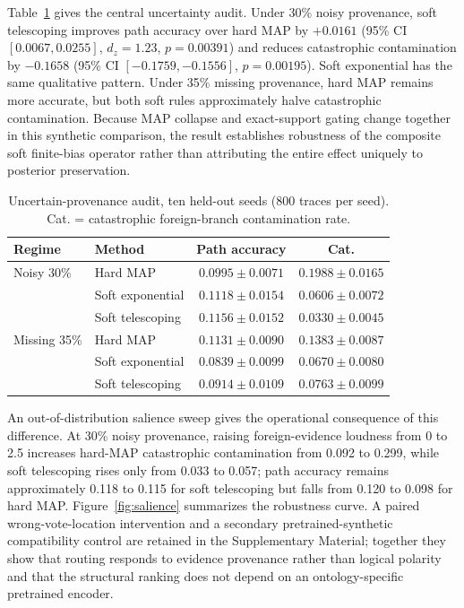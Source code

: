 \documentclass[preprint,11pt]{elsarticle}
\begin{document}
Table~\ref{tab:uncertain} gives the central uncertainty audit. Under 30\% noisy provenance, soft telescoping improves path accuracy over hard MAP by $+0.0161$ (95\% CI $[0.0067,0.0255]$, $d_z=1.23$, $p=0.00391$) and reduces catastrophic contamination by $-0.1658$ (95\% CI $[-0.1759,-0.1556]$, $p=0.00195$). Soft exponential has the same qualitative pattern. Under 35\% missing provenance, hard MAP remains more accurate, but both soft rules approximately halve catastrophic contamination. Because MAP collapse and exact-support gating change together in this synthetic comparison, the result establishes robustness of the composite soft finite-bias operator rather than attributing the entire effect uniquely to posterior preservation.

\begin{table}[H]
\centering
\caption{Uncertain-provenance audit, ten held-out seeds (800 traces per seed). Cat. = catastrophic foreign-branch contamination rate.}
\label{tab:uncertain}
\begin{tabular}{llcc}
\toprule
Regime & Method & Path accuracy & Cat.\\
\midrule
Noisy 30\% & Hard MAP & $0.0995\pm0.0071$ & $0.1988\pm0.0165$\\
& Soft exponential & $0.1118\pm0.0154$ & $0.0606\pm0.0072$\\
& Soft telescoping & $0.1156\pm0.0152$ & $0.0330\pm0.0045$\\
\addlinespace
Missing 35\% & Hard MAP & $0.1131\pm0.0090$ & $0.1383\pm0.0087$\\
& Soft exponential & $0.0839\pm0.0099$ & $0.0670\pm0.0080$\\
& Soft telescoping & $0.0914\pm0.0109$ & $0.0763\pm0.0099$\\
\bottomrule
\end{tabular}
\end{table}

An out-of-distribution salience sweep gives the operational consequence of this difference. At 30\% noisy provenance, raising foreign-evidence loudness from 0 to 2.5 increases hard-MAP catastrophic contamination from 0.092 to 0.299, while soft telescoping rises only from 0.033 to 0.057; path accuracy remains approximately 0.118 to 0.115 for soft telescoping but falls from 0.120 to 0.098 for hard MAP. Figure~\ref{fig:salience} summarizes the robustness curve. A paired wrong-vote-location intervention and a secondary pretrained-synthetic compatibility control are retained in the Supplementary Material; together they show that routing responds to evidence provenance rather than logical polarity and that the structural ranking does not depend on an ontology-specific pretrained encoder.
\end{document}
